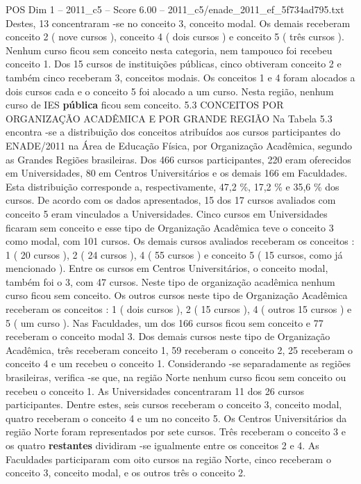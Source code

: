 \begin{textsample}{POS Dim 1 – 2011\_c5 – Score 6.00 – 2011\_c5/enade\_2011\_ef\_5f734ad795.txt}
Destes, 13 concentraram -se no conceito 3, conceito modal.
Os demais receberam conceito 2 ( nove cursos ), conceito 4 ( dois cursos ) e conceito 5 ( três cursos ).
Nenhum curso ficou sem conceito nesta categoria, nem tampouco foi recebeu conceito 1.
Dos 15 cursos de instituições públicas, cinco obtiveram conceito 2 e também cinco receberam 3, conceitos modais.
Os conceitos 1 e 4 foram alocados a dois cursos cada e o conceito 5 foi alocado a um curso.
Nesta região, nenhum curso de IES \textbf{pública} ficou sem conceito. 5.3 CONCEITOS POR ORGANIZAÇÃO ACADÊMICA E POR GRANDE REGIÃO Na Tabela 5.3 encontra -se a distribuição dos conceitos atribuídos aos cursos participantes do ENADE/2011 na Área de Educação Física, por Organização Acadêmica, segundo as Grandes Regiões brasileiras.
Dos 466 cursos participantes, 220 eram oferecidos em Universidades, 80 em Centros Universitários e os demais 166 em Faculdades.
Esta distribuição corresponde a, respectivamente, 47,2 \%, 17,2 \% e 35,6 \% dos cursos.
De acordo com os dados apresentados, 15 dos 17 cursos avaliados com conceito 5 eram vinculados a Universidades.
Cinco cursos em Universidades ficaram sem conceito e esse tipo de Organização Acadêmica teve o conceito 3 como modal, com 101 cursos.
Os demais cursos avaliados receberam os conceitos : 1 ( 20 cursos ), 2 ( 24 cursos ), 4 ( 55 cursos ) e conceito 5 ( 15 cursos, como já mencionado ).
Entre os cursos em Centros Universitários, o conceito modal, também foi o 3, com 47 cursos.
Neste tipo de organização acadêmica nenhum curso ficou sem conceito.
Os outros cursos neste tipo de Organização Acadêmica receberam os conceitos : 1 ( dois cursos ), 2 ( 15 cursos ), 4 ( outros 15 cursos ) e 5 ( um curso ).
Nas Faculdades, um dos 166 cursos ficou sem conceito e 77 receberam o conceito modal 3.
Dos demais cursos neste tipo de Organização Acadêmica, três receberam conceito 1, 59 receberam o conceito 2, 25 receberam o conceito 4 e um recebeu o conceito 1.
Considerando -se separadamente as regiões brasileiras, verifica -se que, na região Norte nenhum curso ficou sem conceito ou recebeu o conceito 1.
As Universidades concentraram 11 dos 26 cursos participantes.
Dentre estes, seis cursos receberam o conceito 3, conceito modal, quatro receberam o conceito 4 e um no conceito 5.
Os Centros Universitários da região Norte foram representados por sete cursos.
Três receberam o conceito 3 e os quatro \textbf{restantes} dividiram -se igualmente entre os conceitos 2 e 4.
As Faculdades participaram com oito cursos na região Norte, cinco receberam o conceito 3, conceito modal, e os outros três o conceito 2.

\end{textsample}
